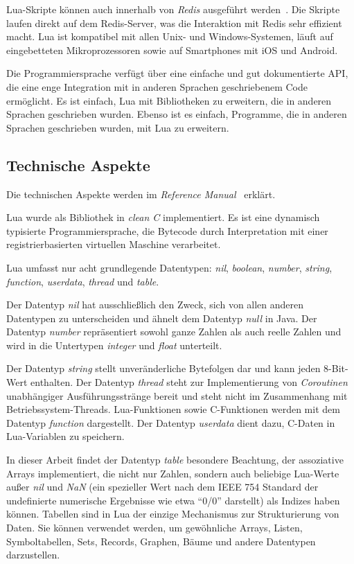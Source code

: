 Lua-Skripte können auch innerhalb von \emph{Redis} ausgeführt werden~\cite{redis_ltd_scripting_nodate}. Die Skripte laufen direkt auf dem Redis-Server, was die Interaktion mit Redis sehr effizient macht.
Lua ist kompatibel mit allen Unix- und Windows-Systemen, läuft auf eingebetteten Mikroprozessoren sowie auf Smartphones mit iOS und Android.

Die Programmiersprache verfügt über eine einfache und gut dokumentierte API, die eine enge Integration mit in anderen Sprachen geschriebenem Code ermöglicht. Es ist einfach, Lua mit Bibliotheken zu erweitern, die in anderen Sprachen geschrieben wurden. Ebenso ist es einfach, Programme, die in anderen Sprachen geschrieben wurden, mit Lua zu erweitern.
\subsection{Technische Aspekte}
Die technischen Aspekte werden im \emph{Reference Manual}~\cite{ierusalimschy_lua_nodate-1} erklärt.

Lua wurde als Bibliothek in \emph{clean C} implementiert. Es ist eine dynamisch typisierte Programmiersprache, die Bytecode durch Interpretation mit einer registrierbasierten virtuellen Maschine verarbeitet.

Lua umfasst nur acht grundlegende Datentypen: \emph{nil}, \emph{boolean}, \emph{number}, \emph{string}, \emph{function}, \emph{userdata}, \emph{thread} und \emph{table}.

Der Datentyp \emph{nil} hat ausschließlich den Zweck, sich von allen anderen Datentypen zu unterscheiden und ähnelt dem Datentyp \emph{null} in Java. Der Datentyp \emph{number} repräsentiert sowohl ganze Zahlen als auch reelle Zahlen und wird in die Untertypen \emph{integer} und \emph{float} unterteilt.

Der Datentyp \emph{string} stellt unveränderliche Bytefolgen dar und kann jeden 8-Bit-Wert enthalten. Der Datentyp \emph{thread} steht zur Implementierung von \emph{Coroutinen} unabhängiger Ausführungsstränge bereit und steht nicht im Zusammenhang mit Betriebssystem-Threads.
Lua-Funktionen sowie C-Funktionen werden mit dem Datentyp \emph{function} dargestellt.
Der Datentyp \emph{userdata} dient dazu, C-Daten in Lua-Variablen zu speichern.

In dieser Arbeit findet der Datentyp \emph{table} besondere Beachtung, der assoziative Arrays implementiert, die nicht nur Zahlen, sondern auch beliebige Lua-Werte außer \emph{nil} und \emph{NaN} (ein spezieller Wert nach dem IEEE 754 Standard der undefinierte numerische Ergebnisse wie etwa \enquote{0/0} darstellt) als Indizes haben können.
Tabellen sind in Lua der einzige Mechanismus zur Strukturierung von Daten. Sie können verwendet werden, um gewöhnliche Arrays, Listen, Symboltabellen, Sets, Records, Graphen, Bäume und andere Datentypen darzustellen.

